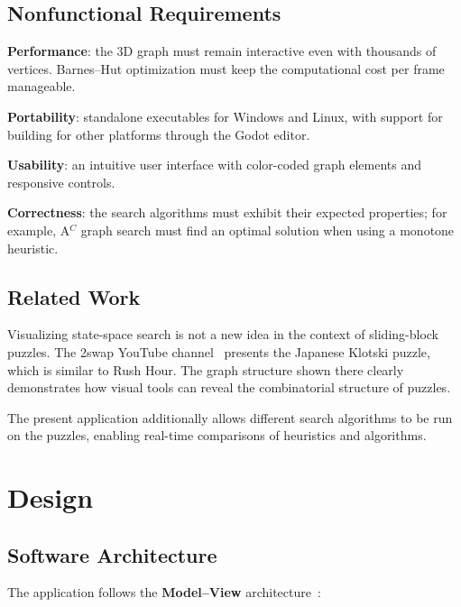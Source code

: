 \subsection{Nonfunctional Requirements}

\begin{compactitem}
\item \textbf{Performance}: the 3D graph must remain interactive even with thousands of vertices. Barnes--Hut optimization must keep the computational cost per frame manageable.
\item \textbf{Portability}: standalone executables for Windows and Linux, with support for building for other platforms through the Godot editor.
\item \textbf{Usability}: an intuitive user interface with color-coded graph elements and responsive controls.
\item \textbf{Correctness}: the search algorithms must exhibit their expected properties; for example, A$^C$ graph search must find an optimal solution when using a monotone heuristic.
\end{compactitem}

\subsection{Related Work}

Visualizing state-space search is not a new idea in the context of sliding-block puzzles. The 2swap YouTube channel~\cite{2swap_klotski} presents the Japanese Klotski puzzle, which is similar to Rush Hour. The graph structure shown there clearly demonstrates how visual tools can reveal the combinatorial structure of puzzles.

The present application additionally allows different search algorithms to be run on the puzzles, enabling real-time comparisons of heuristics and algorithms.

\section{Design}

\subsection{Software Architecture}

The application follows the \textbf{Model--View} architecture~\cite{krasner1988mvc}:

